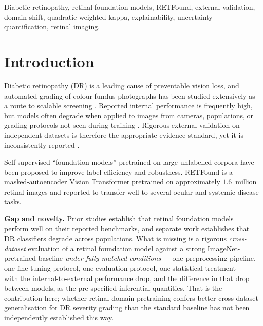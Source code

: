 \documentclass[journal]{IEEEtran}
\renewcommand{\_}{\origunderscore\allowbreak}
\begin{document}
\begin{IEEEkeywords}
Diabetic retinopathy, retinal foundation models, RETFound, external validation,
domain shift, quadratic-weighted kappa, explainability, uncertainty
quantification, retinal imaging.
\end{IEEEkeywords}

\IEEEpeerreviewmaketitle


\section{Introduction}
\label{sec:intro}

Diabetic retinopathy (DR) is a leading cause of preventable vision loss, and
automated grading of colour fundus photographs has been studied extensively as a
route to scalable screening \cite{gulshan2016,ting2017}. Reported internal
performance is frequently high, but models often degrade when applied to images
from cameras, populations, or grading protocols not seen during training
\cite{beede2020,dai2021spectrum}. Rigorous external validation on independent
datasets is therefore the appropriate evidence standard, yet it is inconsistently
reported \cite{grzybowski2020review,tripodai2024}.

Self-supervised ``foundation models'' pretrained on large unlabelled corpora have
been proposed to improve label efficiency and robustness. RETFound
\cite{zhou2023retfound} is a masked-autoencoder \cite{he2022mae} Vision
Transformer \cite{dosovitskiy2021vit} pretrained on approximately $1.6$~million
retinal images and reported to transfer well to several ocular and systemic
disease tasks.

\textbf{Gap and novelty.} Prior studies establish that retinal foundation models
perform well on their reported benchmarks, and separate work establishes that
DR classifiers degrade across populations. What is missing is a rigorous
\emph{cross-dataset} evaluation of a retinal foundation model against a strong
ImageNet-pretrained baseline \emph{under fully matched conditions} --- one
preprocessing pipeline, one fine-tuning protocol, one evaluation protocol, one
statistical treatment --- with the internal-to-external performance drop, and the
difference in that drop between models, as the pre-specified inferential
quantities. That is the contribution here; whether retinal-domain pretraining
confers better cross-dataset generalisation for DR severity grading than the
standard baseline has not been independently established this way.
\end{document}
